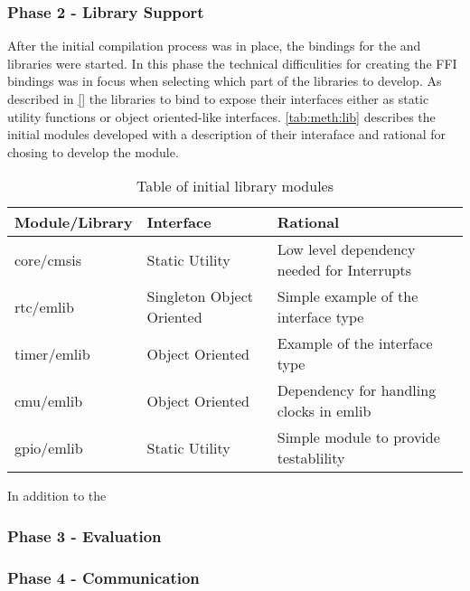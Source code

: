 \subsubsection{Phase 2 - Library Support}

After the initial compilation process was in place, the bindings for the  and \emlib libraries were started.
In this phase the technical difficulities for creating the FFI bindings was in focus when selecting which part of the libraries to develop.
As described in \autoref{}  the libraries to bind to expose their interfaces either as static utility functions or object oriented-like interfaces.
\autoref{tab:meth:lib} describes the initial modules developed with a description of their interaface and rational for chosing to develop the module.

\begin{table}[H]
  \begin{center}
    \begin{tabular}{|l|l|l|}
      \hline
      Module/Library & Interface & Rational \\
      \hline
      \hline
      core/cmsis & Static Utility & Low level dependency needed for Interrupts \\
      rtc/emlib & Singleton Object Oriented & Simple example of the interface type \\
      timer/emlib & Object Oriented & Example of the interface type \\
      cmu/emlib & Object Oriented & Dependency for handling clocks in emlib \\
      gpio/emlib & Static Utility & Simple module to provide testablility \\
    \end{tabular}
  \end{center}
  \caption{Table of initial library modules}
  \label{tab:meth:lib}
\end{table}

In addition to the

\subsubsection{Phase 3 - Evaluation}

\subsubsection{Phase 4 - Communication}

